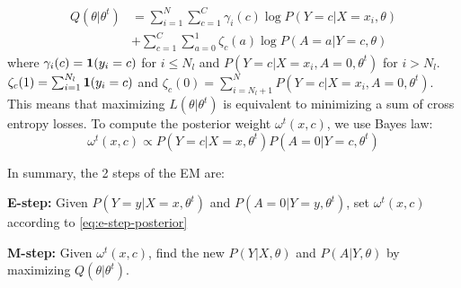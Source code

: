 \vspace*{-.2in}
\begin{equation}
\begin{aligned}
Q(\theta|\theta^t) &= \sum_{i=1}^N \sum_{c=1}^C \gamma_i(c) \log P(Y=c|X=x_i,\theta)\\ 
&+ \sum_{c=1}^C \sum_{a=0}^1 \zeta_c(a) \log P(A=a|Y=c,\theta)
\label{eq:m-step}
\end{aligned}
\end{equation}
where $\gamma_i(c) = \textbf{1}(y_i=c)$ for $i \le N_l$ and $P(Y=c|X=x_i,A=0,\theta^t)$ for $i > N_l$. $\zeta_c(1) = \sum_{i=1}^{N_l} \textbf{1}(y_i=c)$ and $\zeta_c(0) = \sum_{i=N_l+1}^N P(Y=c|X=x_i,A=0,\theta^t)$. This means that maximizing $L(\theta|\theta^t)$ is equivalent to minimizing a sum of cross entropy losses. To compute the posterior weight $\omega^t(x,c)$, we use Bayes law:
\vspace*{-.1in}
\begin{equation}
\omega^t(x,c) \propto P(Y=c|X=x, \theta^t)P(A=0|Y=c, \theta^t)
\label{eq:e-step-posterior}
\end{equation}

\noindent In summary, the 2 steps of the EM are:

\medskip
\noindent
\textbf{E-step:} Given $P(Y=y|X=x,\theta^t)$ and $P(A=0|Y=y,\theta^t)$, set $\omega^t(x,c)$ according to \cref{eq:e-step-posterior}

\noindent
\textbf{M-step:} Given $\omega^t(x,c)$, find the new $P(Y|X,\theta)$ and $P(A|Y,\theta)$ by maximizing $Q(\theta|\theta^t)$. 


